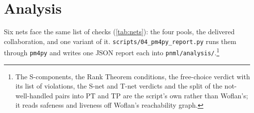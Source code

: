 \section{Analysis}
\label{sec:analysis}

Six nets face the same list of checks (\cref{tab:nets}): the four pools, the delivered collaboration, and one variant of it. \texttt{scripts/04\_pm4py\_report.py} runs them through \texttt{pm4py} and writes one JSON report each into \texttt{pnml/analysis/}.\footnote{The S-components, the Rank Theorem conditions, the free-choice verdict with its list of violations, the S-net and T-net verdicts and the split of the not-well-handled pairs into PT and TP are the script's own rather than Woflan's; it reads safeness and liveness off Woflan's reachability graph.}

\vfill

